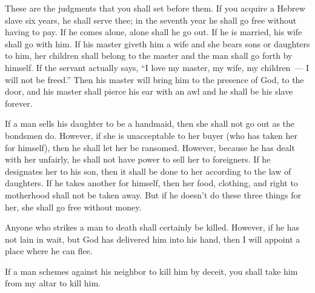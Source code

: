 
\begin{inparaenum}
   These are the judgments that you shall set before them.%
   If you acquire a Hebrew slave six years, he shall serve thee; in the seventh year he shall go free without having to pay.%
   If he comes alone, alone shall he go out. If he is married, his wife shall go with him.%
   If his master giveth him a wife and she bears sons or daughters to him, her children shall belong to the master and the man shall go forth by himself.%
   If the servant actually says, ``I love my master, my wife, my children~--- I will not be freed.''%
   Then his master will bring him to the presence of God, to the door, and his master shall pierce his ear with an awl and he shall be his slave forever.%

   If a man sells his daughter to be a handmaid, then she shall not go out as the bondsmen do.%
   However, if she is unacceptable to her buyer (who has taken her for himself), then he shall let her be ransomed. However, because he has dealt with her unfairly, he shall not have power to sell her to foreigners.%
   If he designates her to his son, then it shall be done to her according to the law of daughters.%
   If he takes another for himself, then her food, clothing, and right to motherhood shall not be taken away.%
   But if he doesn't do these three things for her, she shall go free without money.%

   Anyone who strikes a man to death shall certainly be killed.%
   However, if he has not lain in wait, but God has delivered him into his hand, then I will appoint a place where he can flee.%

   If a man schemes against his neighbor to kill him by deceit, you shall take him from my altar to kill him.%


\end{inparaenum}
